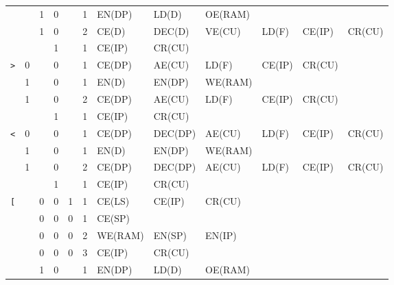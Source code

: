 \begin{table}[H]
{\begin{tabular} {c|cccc|c|llllll}
      \rowcolor{Gray}
                 &   & 1 & 0     &      & 1     & EN(DP) & LD(D)   & OE(RAM) &        &        &        \\
      \rowcolor{Gray}
                 &   & 1 & 0     &      & 2     & CE(D)  & DEC(D)  & VE(CU)  & LD(F)  & CE(IP) & CR(CU) \\
      \rowcolor{White}
                 &   &   & 1     &      & 1     & CE(IP) & CR(CU)  &         &        &        &        \\ \hline
      \rowcolor{Gray}
      \texttt{>} & 0 &   & 0     &      & 1     & CE(DP) & AE(CU)  & LD(F)   & CE(IP) & CR(CU) &        \\
      \rowcolor{White}
                 & 1 &   & 0     &      & 1     & EN(D)  & EN(DP)  & WE(RAM) &        &        &        \\
      \rowcolor{White}
                 & 1 &   & 0     &      & 2     & CE(DP) & AE(CU)  & LD(F)   & CE(IP) & CR(CU) &        \\
      \rowcolor{Gray}
                 &   &   & 1     &      & 1     & CE(IP) & CR(CU)  &         &        &        &         \\ \hline
      \rowcolor{White}
      \texttt{<} & 0 &   & 0     &      & 1     & CE(DP)  & DEC(DP) & AE(CU)  & LD(F)  & CE(IP) & CR(CU) \\
      \rowcolor{Gray}
                 & 1 &   & 0     &      & 1     & EN(D)   & EN(DP)  & WE(RAM) &        &       &         \\
      \rowcolor{Gray}
                 & 1 &   & 0     &      & 2     & CE(DP)  & DEC(DP) & AE(CU)  & LD(F)  & CE(IP) & CR(CU) \\
                 &   &   & 1     &      & 1     & CE(IP)  & CR(CU)  &         &        &       &          \\ \hline
      \rowcolor{Gray}
      \texttt{[} &   & 0 & 0     & 1    & 1     & CE(LS)  & CE(IP)  & CR(CU)  &        &       &          \\
      \rowcolor{White}  
                 &   & 0 & 0     & 0    & 1     & CE(SP)  &         &         &        &       &          \\
      \rowcolor{White}
                 &   & 0 & 0     & 0    & 2     & WE(RAM) & EN(SP) & EN(IP)   &        &       &          \\
      \rowcolor{White}
                 &   & 0 & 0     & 0    & 3     & CE(IP)  & CR(CU) &          &        &       &          \\
      \rowcolor{Gray}
                 &   & 1 & 0     &      & 1     & EN(DP)  & LD(D) & OE(RAM)   &        &       &          \\

\end{tabular}}
\end{table}
